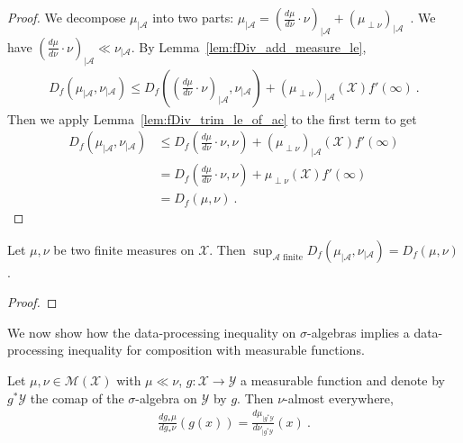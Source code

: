 \begin{proof}\leanok
{}
We decompose $\mu_{| \mathcal A}$ into two parts: $\mu_{| \mathcal A} = (\frac{d\mu}{d\nu}\cdot \nu)_{| \mathcal A} + (\mu_{\perp \nu})_{| \mathcal A}$~. 
We have $(\frac{d\mu}{d\nu}\cdot \nu)_{| \mathcal A} \ll \nu_{| \mathcal A}$.
By Lemma~\ref{lem:fDiv_add_measure_le},
\begin{align*}
D_f(\mu_{| \mathcal A}, \nu_{| \mathcal A})
\le D_f\left((\frac{d\mu}{d\nu}\cdot \nu)_{| \mathcal A}, \nu_{| \mathcal A}\right)
  + (\mu_{\perp \nu})_{| \mathcal A}(\mathcal X) f'(\infty)
\: .
\end{align*}
Then we apply Lemma~\ref{lem:fDiv_trim_le_of_ac} to the first term to get
\begin{align*}
D_f(\mu_{| \mathcal A}, \nu_{| \mathcal A})
&\le D_f\left(\frac{d\mu}{d\nu}\cdot \nu, \nu\right)
  + (\mu_{\perp \nu})_{| \mathcal A}(\mathcal X) f'(\infty)
\\
&= D_f\left(\frac{d\mu}{d\nu}\cdot \nu, \nu\right)
  + \mu_{\perp \nu}(\mathcal X) f'(\infty)
\\
&= D_f(\mu, \nu)
\: .
\end{align*}
\end{proof}


\begin{theorem}
  \label{thm:iSup_fDiv_trim}
  Let $\mu, \nu$ be two finite measures on $\mathcal X$. Then
  $\sup_{\mathcal A \text{ finite}} D_f(\mu_{| \mathcal A}, \nu_{| \mathcal A}) = D_f(\mu, \nu)$.
\end{theorem}

\begin{proof}
\end{proof}


We now show how the data-processing inequality on $\sigma$-algebras implies a data-processing inequality for composition with measurable functions.

\begin{lemma}
  \label{lem:rnDeriv_map_eq_rnDeriv_trim}
  \uses{}
  Let $\mu, \nu \in \mathcal M(\mathcal X)$ with $\mu \ll \nu$, $g : \mathcal X \to \mathcal Y$ a measurable function and denote by $g^* \mathcal Y$ the comap of the $\sigma$-algebra on $\mathcal Y$ by $g$.
  Then $\nu$-almost everywhere,
  \begin{align*}
  \frac{d g_*\mu}{d g_*\nu}(g(x)) = \frac{d \mu_{| g^* \mathcal Y}}{d \nu_{| g^* \mathcal Y}}(x)
  \: .
  \end{align*}
\end{lemma}

